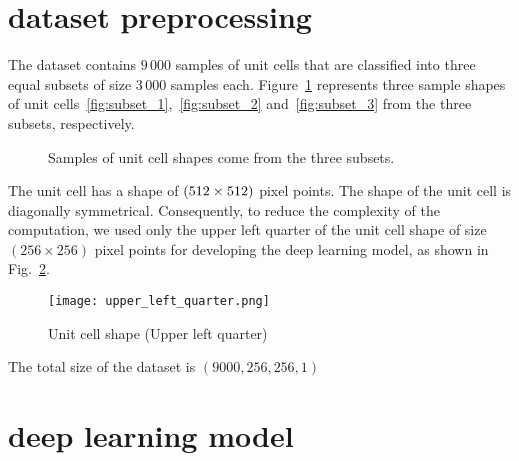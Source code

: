 \documentclass[preprint,9pt]{elsarticle}
\begin{document}
	\section{dataset preprocessing}
	The dataset contains \(9\,000\) samples of unit cells that are classified into three equal subsets of size \(3\,000\) samples each.
	Figure~\ref{fig:subsets} represents three sample shapes of unit cells~\ref{fig:subset_1},~\ref{fig:subset_2} and~\ref{fig:subset_3} from the three subsets, respectively.
	\begin{figure}[ht!]
		\centering
		\quad
		\quad
		\caption{Samples of unit cell shapes come from the three subsets.}
		\label{fig:subsets}
	\end{figure}
	
	The unit cell has a shape of \((\textup{512}\times \textup{512})\) pixel points.
	The shape of the unit cell is diagonally symmetrical.
	Consequently, to reduce the complexity of the computation, we used only the upper left quarter of the unit cell shape of size \((256\times 256)\) pixel points for developing the deep learning model, as shown in Fig.~\ref{fig:upper_right_quater}. 
	\begin{figure}[ht!]
		\centering
		\texttt{[image: upper\_left\_quarter.png]}
		\caption{Unit cell shape (Upper left quarter)}
		\label{fig:upper_right_quater} 
	\end{figure}
	
	The total size of the dataset is \((9000, 256, 256, 1)\)
	 
	\section{deep learning model}
\end{document}
